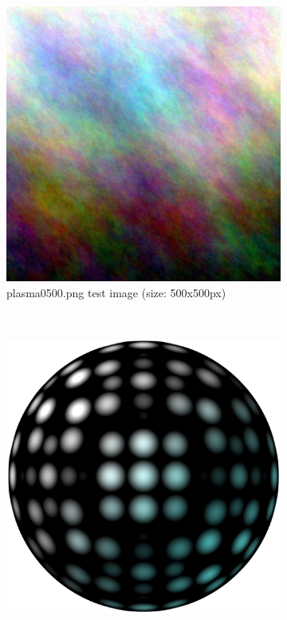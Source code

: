 \documentclass{article}
\begin{document}
\begin{figure}
\centering
\begin{subfigure}[b]{0.3\textwidth}
        \includegraphics[width=\textwidth]{../data/plasma0500.png}
        \caption{plasma0500.png test image (size: 500x500px)}
        \label{fig:plasma0500}
\end{subfigure}
~
\begin{subfigure}[b]{0.3\textwidth}
        \includegraphics[width=\textwidth]{../data/spotted_ball_3500.png}

\end{subfigure}
\end{figure}
\end{document}
